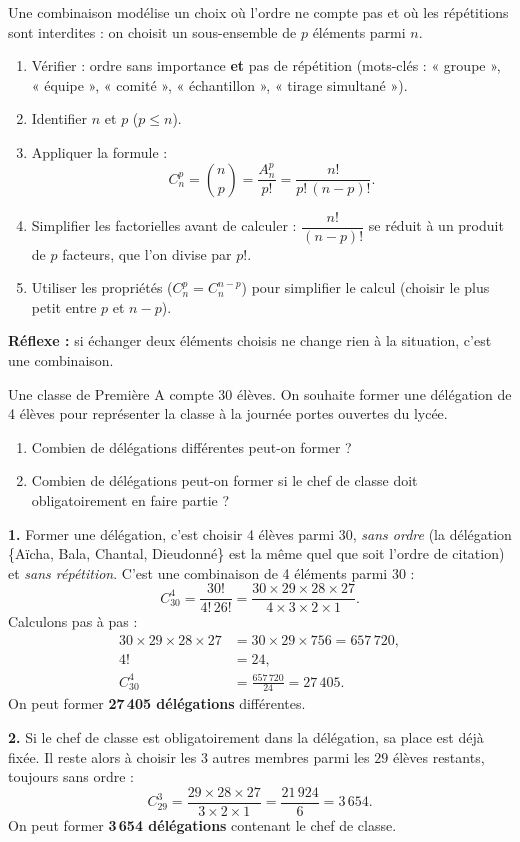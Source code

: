 \documentclass[11pt]{article}
\newcommand{\cle}[1]{{\popxbold\color{popdark}#1}}
\begin{document}
\begin{methode}
Une \cle{combinaison} modélise un choix où l'\cle{ordre ne compte pas} et où les répétitions sont interdites : on choisit un \cle{sous-ensemble} de $p$ éléments parmi $n$.
\begin{enumerate}
\item Vérifier : ordre sans importance \textbf{et} pas de répétition (mots-clés : « groupe », « équipe », « comité », « échantillon », « tirage simultané »).
\item Identifier $n$ et $p$ ($p\leq n$).
\item Appliquer la formule :
\[ C_n^p=\binom{n}{p}=\frac{A_n^p}{p!}=\frac{n!}{p!\,(n-p)!}. \]
\item Simplifier les factorielles avant de calculer : $\dfrac{n!}{(n-p)!}$ se réduit à un produit de $p$ facteurs, que l'on divise par $p!$.
\item Utiliser les propriétés ($C_n^p=C_n^{n-p}$) pour simplifier le calcul (choisir le plus petit entre $p$ et $n-p$).
\end{enumerate}
\textbf{Réflexe :} si échanger deux éléments choisis ne change rien à la situation, c'est une combinaison.
\end{methode}

\begin{exoresolu}
Une classe de Première A compte 30 élèves. On souhaite former une délégation de 4 élèves pour représenter la classe à la journée portes ouvertes du lycée.
\begin{enumerate}
\item Combien de délégations différentes peut-on former ?
\item Combien de délégations peut-on former si le chef de classe doit obligatoirement en faire partie ?
\end{enumerate}
\tcblower
\textbf{1.} Former une délégation, c'est choisir 4 élèves parmi 30, \emph{sans ordre} (la délégation \{Aïcha, Bala, Chantal, Dieudonné\} est la même quel que soit l'ordre de citation) et \emph{sans répétition}. C'est une combinaison de 4 éléments parmi 30 :
\[ C_{30}^4=\frac{30!}{4!\,26!}=\frac{30\times 29\times 28\times 27}{4\times 3\times 2\times 1}. \]
Calculons pas à pas :
\begin{align*}
30\times 29\times 28\times 27 &= 30\times 29\times 756 = 657\,720,\\
4! &= 24,\\
C_{30}^4 &= \frac{657\,720}{24}=27\,405.
\end{align*}
On peut former \textbf{27\,405 délégations} différentes.

\textbf{2.} Si le chef de classe est obligatoirement dans la délégation, sa place est déjà fixée. Il reste alors à choisir les $3$ autres membres parmi les $29$ élèves restants, toujours sans ordre :
\[ C_{29}^3=\frac{29\times 28\times 27}{3\times 2\times 1}=\frac{21\,924}{6}=3\,654. \]
On peut former \textbf{3\,654 délégations} contenant le chef de classe.
\end{exoresolu}
\end{document}
